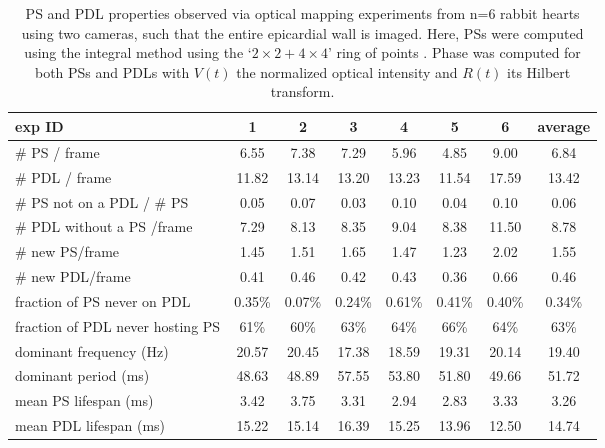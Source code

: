 \documentclass{article}
\begin{document}
\begin{table*}[htp]
    \centering
 \begin{tabular}{l | c c c c c c| c }
 exp ID & 1& 2& 3&4 &5 &6 & average \\ \hline
 \# PS / frame & 6.55 & 7.38 & 7.29 & 5.96 & 4.85 & 9.00 & 6.84 \\ 
 \# PDL / frame& 11.82 & 13.14 & 13.20 & 13.23 & 11.54 & 17.59 & 13.42 \\
\# PS not on a PDL / \# PS & 0.05 & 0.07 & 0.03 & 0.10 & 0.04 & 0.10 & 0.06 \\ 
 \# PDL without a PS /frame  & 7.29 & 8.13 & 8.35 & 9.04 & 8.38 & 11.50 & 8.78 \\ 
\# new PS/frame & 1.45 & 1.51 & 1.65 & 1.47 & 1.23 & 2.02 & 1.55 \\ 
\# new PDL/frame & 0.41 & 0.46 & 0.42 & 0.43 & 0.36 & 0.66 & 0.46 \\ \hline
fraction of PS never on PDL & 0.35\% & 0.07\% & 0.24\% & 0.61\% & 0.41\% & 0.40\% & 0.34\% \\ 
fraction of PDL never hosting PS & 61\% & 60\% & 63\% & 64\% & 66\% & 64\% & 63\%\\ \hline
dominant frequency (Hz) & 20.57 & 20.45 & 17.38 & 18.59 & 19.31 & 20.14 & 19.40\\ 
dominant period (ms) & 48.63 & 48.89 & 57.55 & 53.80 & 51.80 & 49.66 & 51.72 \\ 
mean PS lifespan (ms) & 3.42 & 3.75 & 3.31 & 2.94 & 2.83 & 3.33 & 3.26 \\ 
mean PDL lifespan (ms) & 15.22 & 15.14 & 16.39 & 15.25 & 13.96 & 12.50 & 14.74 \\
 \end{tabular}
     \caption{PS and PDL properties observed via optical mapping experiments from n=6 rabbit hearts using two cameras, such that the entire epicardial wall is imaged. Here, PSs were computed using the integral method using the `$2\times2+4\times4$' ring of points \citep{Kuklik:2017}. Phase was computed for both PSs and PDLs with $V(t)$ the normalized optical intensity and $R(t)$ its Hilbert transform.}
    \label{tab:stats}
\end{table*}
\end{document}
